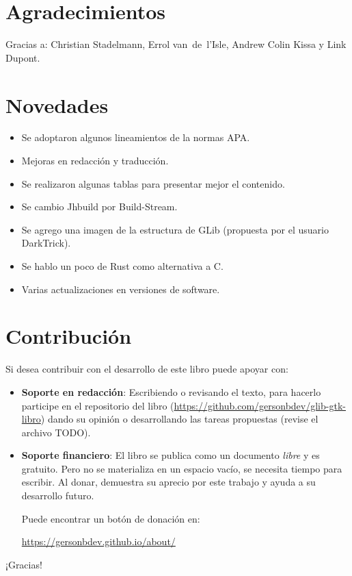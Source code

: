 \section{Agradecimientos}
    Gracias a: Christian Stadelmann, Errol van~de~l'Isle, Andrew Colin Kissa y Link Dupont.

\newpage

\section{Novedades}

     \begin{itemize}
         \item Se adoptaron algunos lineamientos de la normas APA.
         \item Mejoras en redacción y traducción.
         \item Se realizaron algunas tablas para presentar mejor el contenido.
         \item Se cambio Jhbuild por Build-Stream.
         \item Se agrego una imagen de la estructura de GLib (propuesta por el usuario DarkTrick).
         \item Se hablo un poco de Rust como alternativa a C.
         \item Varias actualizaciones en versiones de software.
     \end{itemize}

\section{Contribución}

    \noindent
    Si desea contribuir con el desarrollo de este libro puede apoyar con:
    
    \begin{itemize}
        \item \textbf{Soporte en redacción}: Escribiendo o revisando el texto, para hacerlo participe en el repositorio del libro (\url{https://github.com/gersonbdev/glib-gtk-libro}) dando su opinión o desarrollando las tareas propuestas (revise el archivo TODO).
        
        \item \textbf{Soporte financiero}: El libro se publica como un documento \emph{libre} y es gratuito. Pero no se materializa en un espacio vacío, se necesita tiempo para escribir. Al donar, demuestra su aprecio por este trabajo y ayuda a su desarrollo futuro.
        
        Puede encontrar un botón de donación en:
    
        \url{https://gersonbdev.github.io/about/}
        
    \end{itemize}
    
    ¡Gracias!